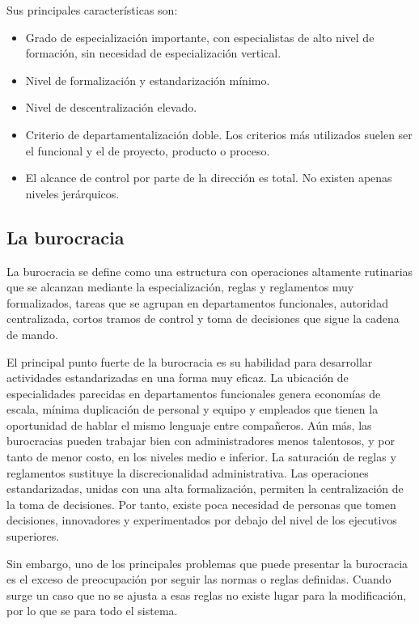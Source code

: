 \documentclass[
]{krantz}
\providecommand{\tightlist}{%
  \setlength{\itemsep}{0pt}\setlength{\parskip}{0pt}}
\begin{document}
Sus principales características son:

\begin{itemize}
\tightlist
\item
  Grado de especialización importante, con especialistas de alto nivel de formación, sin necesidad de especialización vertical.
\item
  Nivel de formalización y estandarización mínimo.
\item
  Nivel de descentralización elevado.
\item
  Criterio de departamentalización doble. Los criterios más utilizados suelen ser el funcional y el de proyecto, producto o proceso.
\item
  El alcance de control por parte de la dirección es total. No existen apenas niveles jerárquicos.
\end{itemize}

\hypertarget{la-burocracia}{%
\subsection{La burocracia}\label{la-burocracia}}

La burocracia se define como una estructura con operaciones altamente rutinarias que se alcanzan mediante la especialización, reglas y reglamentos muy formalizados, tareas que se agrupan en departamentos funcionales, autoridad centralizada, cortos tramos de control y toma de decisiones que sigue la cadena de mando.

El principal punto fuerte de la burocracia es su habilidad para desarrollar actividades estandarizadas en una forma muy eficaz. La ubicación de especialidades parecidas en departamentos funcionales genera economías de escala, mínima duplicación de personal y equipo y empleados que tienen la oportunidad de hablar el mismo lenguaje entre compañeros. Aún más, las burocracias pueden trabajar bien con administradores menos talentosos, y por tanto de menor costo, en los niveles medio e inferior. La saturación de reglas y reglamentos sustituye la discrecionalidad administrativa. Las operaciones estandarizadas, unidas con una alta formalización, permiten la centralización de la toma de decisiones. Por tanto, existe poca necesidad de personas que tomen decisiones, innovadores y experimentados por debajo del nivel de los ejecutivos superiores.

Sin embargo, uno de los principales problemas que puede presentar la burocracia es el exceso de preocupación por seguir las normas o reglas definidas. Cuando surge un caso que no se ajusta a esas reglas no existe lugar para la modificación, por lo que se para todo el sistema.
\end{document}
